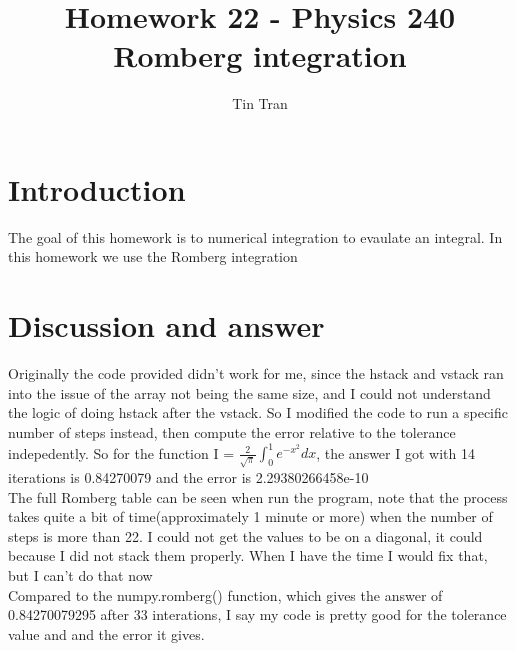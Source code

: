 \documentclass{article}
\begin{document}
\title{Homework 22 - Physics 240\\
		Romberg integration}
\author{Tin Tran}

\maketitle

\section{Introduction}
The goal of this homework is to numerical integration to evaulate an integral. In this homework we use the Romberg integration

\section{Discussion and answer}
Originally the code provided didn't work for me, since the hstack and vstack ran into the issue of the array not being the same size, and I could not understand the logic of doing hstack after the vstack. So I modified the code to run a specific number of steps instead, then compute the error relative to the tolerance indepedently. So for the function I = $\frac{2}{\sqrt{\pi}}\int_0^1e^{-x^2}dx$, the answer I got with 14 iterations is 0.84270079 and the error is 2.29380266458e-10 \\
The full Romberg table can be seen when run the program, note that the process takes quite a bit of time(approximately 1 minute or more) when the number of steps is more than 22. I could not get the values to be on a diagonal, it could because I did not stack them properly. When I have the time I would fix that, but I can't do that now\\
Compared to the numpy.romberg() function, which gives the answer of 0.84270079295 after 33 interations, I say my code is pretty good for the tolerance value and and the error it gives.
\end{document}
